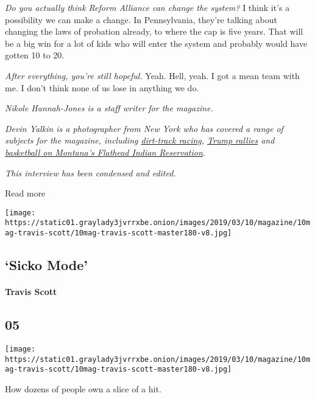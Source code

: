 \emph{Do you actually think Reform Alliance can change the system?} I
think it's a possibility we can make a change. In Pennsylvania, they're
talking about changing the laws of probation already, to where the cap
is five years. That will be a big win for a lot of kids who will enter
the system and probably would have gotten 10 to 20.

\emph{After everything, you're still hopeful.} Yeah. Hell, yeah. I got a
mean team with me. I don't think none of us lose in anything we do.

\emph{Nikole Hannah-Jones is a staff writer for the magazine.}

\emph{Devin Yalkin is a photographer from New York who has covered a
range of subjects for the magazine, including
\href{https://www.nytimes3xbfgragh.onion/2018/10/18/magazine/dirt-track-racing-nascar-tony-stewart.html}{dirt-track
racing},
\href{https://www.nytimes3xbfgragh.onion/2016/04/17/magazine/donald-trump-american-preacher.html}{Trump
rallies} and
\href{https://www.nytimes3xbfgragh.onion/2018/04/04/magazine/arlee-warriors-montana-basketball-flathead-indian-reservation.html}{basketball
on Montana's Flathead Indian Reservation}.}

\emph{This interview has been condensed and edited.}

Read more

\texttt{[image: https://static01.graylady3jvrrxbe.onion/images/2019/03/10/magazine/10mag-travis-scott/10mag-travis-scott-master180-v8.jpg]}

\hypertarget{--sicko-mode}{%
\subsection{\texorpdfstring{ `Sicko
Mode'}{  `Sicko Mode'}}\label{--sicko-mode}}

\hypertarget{travis-scott}{%
\paragraph{Travis Scott}\label{travis-scott}}

\hypertarget{05}{%
\subsection{05}\label{05}}

\texttt{[image: https://static01.graylady3jvrrxbe.onion/images/2019/03/10/magazine/10mag-travis-scott/10mag-travis-scott-master180-v8.jpg]}

How dozens of people own a slice of a hit.

